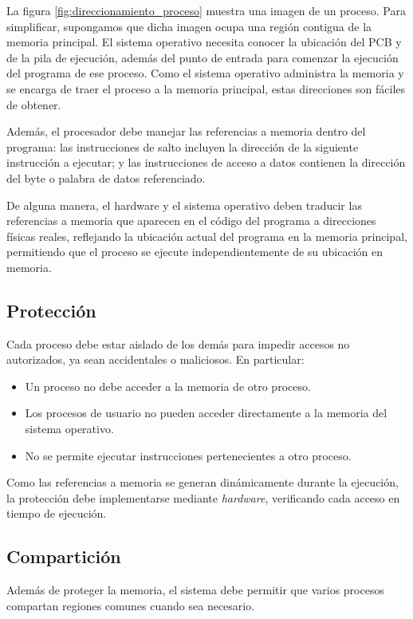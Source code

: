 La figura \ref{fig:direccionamiento_proceso} muestra una imagen de un proceso. Para simplificar, supongamos que dicha imagen ocupa una región contigua de la memoria principal. El sistema operativo necesita conocer la ubicación del PCB y de la pila de ejecución, además del punto de entrada para comenzar la ejecución del programa de ese proceso. Como el sistema operativo administra la memoria y se encarga de traer el proceso a la memoria principal, estas direcciones son fáciles de obtener.

Además, el procesador debe manejar las referencias a memoria dentro del programa: las instrucciones de salto incluyen la dirección de la siguiente instrucción a ejecutar; y las instrucciones de acceso a datos contienen la dirección del byte o palabra de datos referenciado. 

De alguna manera, el hardware y el sistema operativo deben traducir las referencias a memoria que aparecen en el código del programa a direcciones físicas reales, reflejando la ubicación actual del programa en la memoria principal, permitiendo que el proceso se ejecute independientemente de su ubicación en memoria.

\subsection{Protección}

Cada proceso debe estar aislado de los demás para impedir accesos no autorizados, ya sean accidentales o maliciosos. En particular:
\begin{itemize}
  \item Un proceso no debe acceder a la memoria de otro proceso.
  \item Los procesos de usuario no pueden acceder directamente a la memoria del sistema operativo.
  \item No se permite ejecutar instrucciones pertenecientes a otro proceso.
\end{itemize}

Como las referencias a memoria se generan dinámicamente durante la ejecución, la protección debe implementarse mediante \textit{hardware}, verificando cada acceso en tiempo de ejecución.

\subsection{Compartición}

Además de proteger la memoria, el sistema debe permitir que varios procesos compartan regiones comunes cuando sea necesario.

